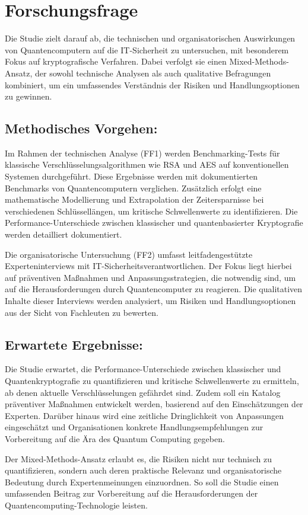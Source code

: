 \section{Forschungsfrage}
Die Studie zielt darauf ab, die technischen und organisatorischen Auswirkungen von Quantencomputern auf die IT-Sicherheit zu untersuchen, mit besonderem Fokus auf kryptografische Verfahren. Dabei verfolgt sie einen Mixed-Methods-Ansatz, der sowohl technische Analysen als auch qualitative Befragungen kombiniert, um ein umfassendes Verständnis der Risiken und Handlungsoptionen zu gewinnen.

\subsection{Methodisches Vorgehen:}

Im Rahmen der technischen Analyse (FF1) werden Benchmarking-Tests für klassische Verschlüsselungsalgorithmen wie RSA und AES auf konventionellen Systemen durchgeführt. Diese Ergebnisse werden mit dokumentierten Benchmarks von Quantencomputern verglichen. Zusätzlich erfolgt eine mathematische Modellierung und Extrapolation der Zeitersparnisse bei verschiedenen Schlüssellängen, um kritische Schwellenwerte zu identifizieren. Die Performance-Unterschiede zwischen klassischer und quantenbasierter Kryptografie werden detailliert dokumentiert.

Die organisatorische Untersuchung (FF2) umfasst leitfadengestützte Experteninterviews mit IT-Sicherheitsverantwortlichen. Der Fokus liegt hierbei auf präventiven Maßnahmen und Anpassungsstrategien, die notwendig sind, um auf die Herausforderungen durch Quantencomputer zu reagieren. Die qualitativen Inhalte dieser Interviews werden analysiert, um Risiken und Handlungsoptionen aus der Sicht von Fachleuten zu bewerten.

\subsection{Erwartete Ergebnisse:}

Die Studie erwartet, die Performance-Unterschiede zwischen klassischer und Quantenkryptografie zu quantifizieren und kritische Schwellenwerte zu ermitteln, ab denen aktuelle Verschlüsselungen gefährdet sind. Zudem soll ein Katalog präventiver Maßnahmen entwickelt werden, basierend auf den Einschätzungen der Experten. Darüber hinaus wird eine zeitliche Dringlichkeit von Anpassungen eingeschätzt und Organisationen konkrete Handlungsempfehlungen zur Vorbereitung auf die Ära des Quantum Computing gegeben.

Der Mixed-Methods-Ansatz erlaubt es, die Risiken nicht nur technisch zu quantifizieren, sondern auch deren praktische Relevanz und organisatorische Bedeutung durch Expertenmeinungen einzuordnen. So soll die Studie einen umfassenden Beitrag zur Vorbereitung auf die Herausforderungen der Quantencomputing-Technologie leisten.